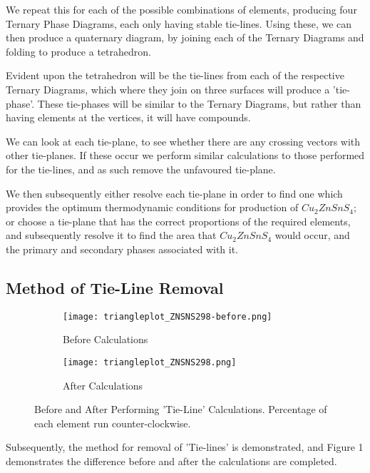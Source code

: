 We repeat this for each of the possible combinations of elements, producing four Ternary Phase Diagrams, each only having stable tie-lines. Using these, we can then produce a quaternary diagram, by joining each of the Ternary Diagrams and folding to produce a tetrahedron. 

Evident upon the tetrahedron will be the tie-lines from each of the respective Ternary Diagrams, which where they join on three surfaces will produce a 'tie-phase'. These tie-phases will be similar to the Ternary Diagrams, but rather than having elements at the vertices, it will have compounds.

We can look at each tie-plane, to see whether there are any crossing vectors with other tie-planes. If these occur we perform similar calculations to those performed for the tie-lines, and as such remove the unfavoured tie-plane.

We then subsequently either resolve each tie-plane in order to find one which provides the optimum thermodynamic conditions for production of $Cu_2ZnSnS_4$; or choose a tie-plane that has the correct proportions of the required elements, and subsequently resolve it to find the area that $Cu_2ZnSnS_4$ would occur, and the primary and secondary phases associated with it.


\subsection{Method of Tie-Line Removal}
\begin{figure}
\centering
\begin{subfigure}{80mm}
  \centering
    \texttt{[image: triangleplot\_ZNSNS298-before.png]}
    \caption{Before Calculations}
    \label{fig:ZnSnSBefore}
\end{subfigure}%
\begin{subfigure}{80mm}
 \centering
    \texttt{[image: triangleplot\_ZNSNS298.png]}
    \caption{After Calculations}
    \label{fig:ZnSnS}
\end{subfigure}
\caption{Before and After Performing 'Tie-Line' Calculations. Percentage of each element run counter-clockwise.}
\label{fig:ZnSnSFigures}
\end{figure}


Subsequently, the method for removal of 'Tie-lines' is demonstrated, and Figure 1 demonstrates the difference before and after the calculations are completed.

